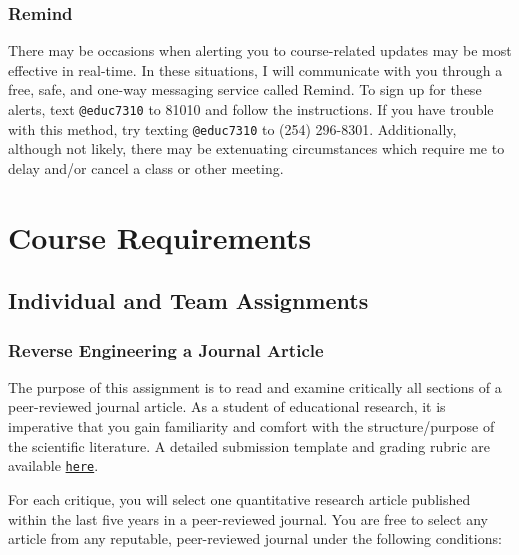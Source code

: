 \documentclass[
]{article}
\begin{document}
\subsubsection{Remind}

There may be occasions when alerting you to course-related updates may
be most effective in real-time. In these situations, I will communicate
with you through a free, safe, and one-way messaging service called
Remind. To sign up for these alerts, text \texttt{@educ7310} to 81010
and follow the instructions. If you have trouble with this method, try
texting \texttt{@educ7310} to (254) 296-8301. Additionally, although not
likely, there may be extenuating circumstances which require me to delay
and/or cancel a class or other meeting.

\section{Course Requirements}

\subsection{Individual and Team Assignments}

\subsubsection{Reverse Engineering a Journal Article}

The purpose of this assignment is to read and examine critically all
sections of a peer-reviewed journal article. As a student of educational
research, it is imperative that you gain familiarity and comfort with
the structure/purpose of the scientific literature. A detailed
submission template and grading rubric are available
\texttt{\href{https://bit.ly/31bLEDx}{here}}.

For each critique, you will select one quantitative research article
published within the last five years in a peer-reviewed journal. You are
free to select any article from any reputable, peer-reviewed journal
under the following conditions:
\end{document}
